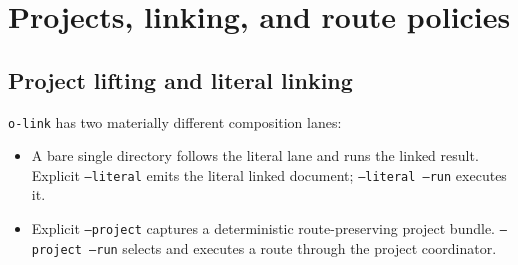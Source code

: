\documentclass[11pt,oneside]{article}
\begin{document}
\section{Projects, linking, and route policies}
\label{sec:projects}

\subsection{Project lifting and literal linking}

\texttt{o-link} has two materially different composition lanes:

\begin{itemize}
  \item A bare single directory follows the literal lane and runs the linked
        result. Explicit \texttt{--literal} emits the literal linked document;
        \texttt{--literal --run} executes it.
  \item Explicit \texttt{--project} captures a deterministic route-preserving
        project bundle. \texttt{--project --run} selects and executes a route
        through the project coordinator.
\end{itemize}
\end{document}
